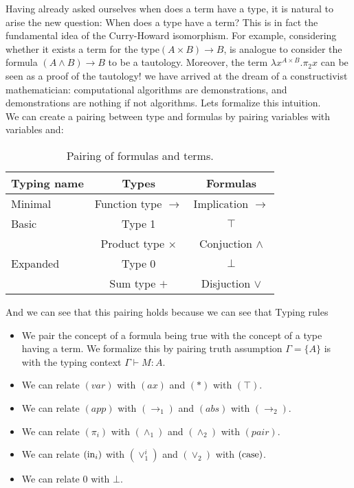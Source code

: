 Having already asked ourselves when does a term have a type, it is natural to arise the new question: When does a type have a term? This is in fact the fundamental idea of the Curry-Howard isomorphism. For example, considering whether it exists a term for the type$(A \times B) \to B$, is analogue to consider the formula $(A\land B)\to B$ to be a tautology. Moreover, the term $\lambda x^{A\times B}. \pi_2 x$ can be seen as a proof of the tautology! we have arrived at the dream of a constructivist mathematician: computational algorithms are demonstrations, and demonstrations are nothing if not algorithms. Lets formalize this intuition.\\


We can create a pairing between type and formulas by pairing variables with variables and:
\begin{table}[!h]
\begin{center}
\begin{tabular}{|l|c|c|}
\hline
  Typing name & Types  & Formulas  \\
  \hline
  Minimal     & Function type $\to$   & Implication $\to$  \\
  \hline 
  Basic      & Type 1 & $\top$ \\
             & Product type $\times$ & Conjuction $\land$ \\
  \hline
  Expanded   & Type 0 & $\bot$ \\
             & Sum type $+$     & Disjuction $\lor$ \\
\hline
\end{tabular}
\caption*{\label{tab:table-name} Pairing of formulas and terms.}
\end{center}
\end{table}

And we can see that this pairing holds because we can see that Typing rules 

\begin{itemize}
\item We pair the concept of a formula being true with the concept of a type having a term. We formalize this by pairing truth assumption $\Gamma=\{A\}$ is with the typing context $\Gamma\vdash M:A$. 
\item We can relate $(var)$ with $(ax)$ and $(*)$ with $(\top)$.
\item We can relate $(app)$ with $(\to_1)$ and $(abs)$ with $(\to_2)$.
\item We can relate $(\pi_i)$ with $(\land_1)$ and $(\land_2)$ with $(pair)$.
\item We can relate $(\operatorname{in}_i)$ with $(\lor_1^i)$ and $(\lor_2)$ with $(\operatorname{case})$.
\item We can relate $0$ with $\bot$.
\end{itemize}


